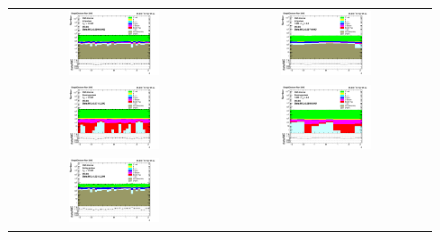 \begin{figure}[htp]
  \begin{center}
    \begin{tabular}{cc}
      \includegraphics[width=0.45\textwidth]{figures/Zprime/2016/ScaleFactor/SameSign/nominal/stack_phi_Barrel_probes_PUW.png} &
      \includegraphics[width=0.45\textwidth]{figures/Zprime/2016/ScaleFactor/SameSign/nominal/stack_phi_Endcap_probes_PUW.png} \\
      \includegraphics[width=0.45\textwidth]{figures/Zprime/2016/ScaleFactor/SameSign/nominal/stack_phi_Barrel_pass_PUW.png} &
      \includegraphics[width=0.45\textwidth]{figures/Zprime/2016/ScaleFactor/SameSign/nominal/stack_phi_Endcap_pass_PUW.png}\\
      \includegraphics[width=0.45\textwidth]{figures/Zprime/2016/ScaleFactor/SameSign/nominal/stack_phi_Barrel_fail_PUW.png} &

\end{tabular}
\end{center}
\end{figure}

